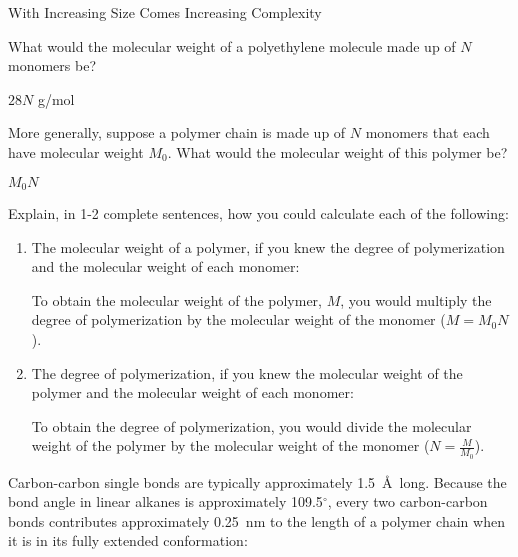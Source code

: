 \begin{activity}{With Increasing Size Comes Increasing Complexity}
\begin{infobox}
\end{infobox}

\begin{ctqs}
		
	\question What would the molecular weight of a polyethylene molecule made up of $N$ monomers be?
	
		\begin{solution}[1in]
			$28 N$ g/mol
		\end{solution}
		
	\question More generally, suppose a polymer chain is made up of $N$ monomers that each have molecular weight $M_0$.  What would the molecular weight of this polymer be?
	
		\begin{solution}[1in]
			$M_0 N$
		\end{solution}
	
	\question Explain, in 1-2 complete sentences, how you could calculate each of the following:
	
		\begin{enumerate}
			\item The molecular weight of a polymer, if you knew the degree of polymerization and the molecular weight of each monomer:
	
		\begin{solution}[1.75in]
			To obtain the molecular weight of the polymer, $M$, you would multiply the degree of polymerization by the molecular weight of the monomer ($M = M_0 N$).
		\end{solution}
			
			\item The degree of polymerization, if you knew the molecular weight of the polymer and the molecular weight of each monomer:
	
		\begin{solution}[1.75in]
			To obtain the degree of polymerization, you would divide the molecular weight of the polymer by the molecular weight of the monomer ($N = \frac{M}{M_0}$).
		\end{solution}
		
		\end{enumerate}
	
\end{ctqs}



\begin{model}
	\label{\labelbase:mdl:polyethylenechainsize}
	
	Carbon-carbon single bonds are typically approximately 1.5~\AA\ long.  Because the bond angle in linear alkanes is approximately 109.5${}^\circ$, every two carbon-carbon bonds contributes approximately 0.25~nm to the length of a polymer chain when it is in its fully extended conformation:
	

\end{model}
\end{activity}
